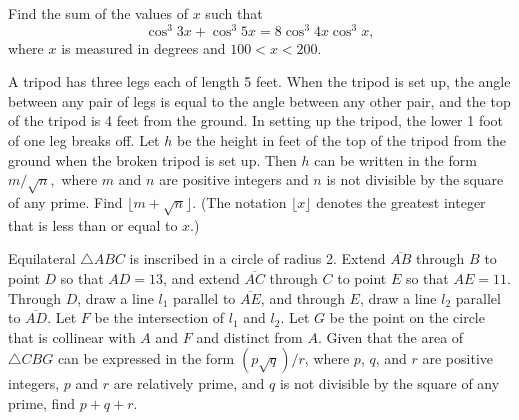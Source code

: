 \begin{question}[name={2006 AIME I, \href{https://artofproblemsolving.com/community/c4p449170}{Problem 12}}]
	Find the sum of the values of $x$ such that $$\cos^3 3x+ \cos^3 5x = 8 \cos^3 4x \cos^3 x,$$ where $x$ is measured in degrees and $100< x< 200$.
\end{question}


%	













\begin{question}[name={2006 AIME I, \href{https://artofproblemsolving.com/community/c4p449183}{Problem 14}}]
	A tripod has three legs each of length 5 feet. When the tripod is set up, the angle between any pair of legs is equal to the angle between any other pair, and the top of the tripod is 4 feet from the ground. In setting up the tripod, the lower 1 foot of one leg breaks off. Let $h$ be the height in feet of the top of the tripod from the ground when the broken tripod is set up. Then $h$ can be written in the form $ m/{\sqrt{n}},$ where $m$ and $n$ are positive integers and $n$ is not divisible by the square of any prime. Find $\lfloor m+\sqrt{n}\rfloor.$ (The notation $\lfloor x\rfloor$ denotes the greatest integer that is less than or equal to $x$.)
\end{question}


%	








\begin{question}[name={2006 AIME II, \href{https://artofproblemsolving.com/community/c4p464986}{Problem 12}}]
	Equilateral $\triangle ABC$ is inscribed in a circle of radius 2. Extend $\overline{AB}$ through $B$ to point $D$ so that $AD=13$, and extend $\overline{AC}$ through $C$ to point $E$ so that $AE=11$. Through $D$, draw a line $l_1$ parallel to $\overline{AE}$, and through $E$, draw a line ${l}_2$ parallel to $\overline{AD}$. Let $F$ be the intersection of ${l}_1$ and ${l}_2$. Let $G$ be the point on the circle that is collinear with $A$ and $F$ and distinct from $A$. Given that the area of $\triangle CBG$ can be expressed in the form $({p\sqrt{q}})/{r}$, where $p$, $q$, and $r$ are positive integers, $p$ and $r$ are relatively prime, and $q$ is not divisible by the square of any prime, find $p+q+r$.
\end{question}










